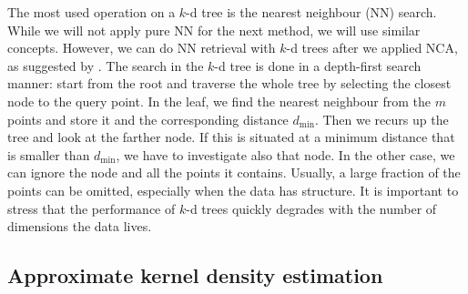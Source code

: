  	The most used operation on a $k$-d tree is the nearest neighbour (NN) search. While we will not apply pure NN for the next method, we will use similar concepts. However, we can do NN retrieval with $k$-d trees after we applied NCA, as suggested by \citet{goldberger2004}. The search in the $k$-d tree is done in a depth-first search manner: start from the root and traverse the whole tree by selecting the closest node to the query point. In the leaf, we find the nearest neighbour from the $m$ points and store it and the corresponding distance $d_\text{min}$. Then we recurs up the tree and look at the farther node. If this is situated at a minimum distance that is smaller than $d_\text{min}$, we have to investigate also that node. In the other case, we can ignore the node and all the points it contains. Usually, a large fraction of the points can be omitted, especially when the data has structure.
 	It is important to stress that the performance of $k$-d trees quickly degrades with the number of dimensions the data lives. 
 	
	
	

\subsection{Approximate kernel density estimation}
\label{subsec:approx-kde}

